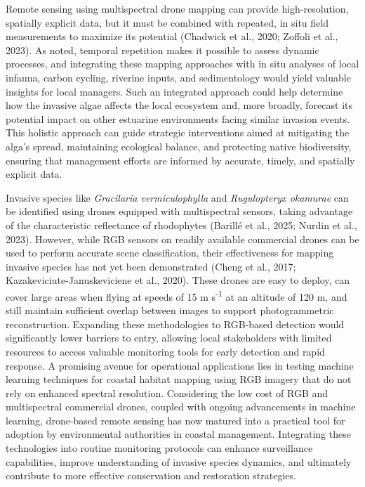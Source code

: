 \documentclass[
  letterpaper,
  DIV=11,
  numbers=noendperiod]{scrartcl}
\begin{document}
Remote sensing using multispectral drone mapping can provide
high-resolution, spatially explicit data, but it must be combined with
repeated, in situ field measurements to maximize its potential (Chadwick
et al., 2020; Zoffoli et al., 2023). As noted, temporal repetition makes
it possible to assess dynamic processes, and integrating these mapping
approaches with in situ analyses of local infauna, carbon cycling,
riverine inputs, and sedimentology would yield valuable insights for
local managers. Such an integrated approach could help determine how the
invasive algae affects the local ecosystem and, more broadly, forecast
its potential impact on other estuarine environments facing similar
invasion events. This holistic approach can guide strategic
interventions aimed at mitigating the alga's spread, maintaining
ecological balance, and protecting native biodiversity, ensuring that
management efforts are informed by accurate, timely, and spatially
explicit data.

Invasive species like \emph{Gracilaria vermiculophylla} and
\emph{Rugulopteryx okamurae} can be identified using drones equipped
with multispectral sensors, taking advantage of the characteristic
reflectance of rhodophytes (Barillé et al., 2025; Nurdin et al., 2023).
However, while RGB sensors on readily available commercial drones can be
used to perform accurate scene classification, their effectiveness for
mapping invasive species has not yet been demonstrated (Cheng et al.,
2017; Kazakeviciute-Januskeviciene et al., 2020). These drones are easy
to deploy, can cover large areas when flying at speeds of 15 m
s\textsuperscript{-1} at an altitude of 120 m, and still maintain
sufficient overlap between images to support photogrammetric
reconstruction. Expanding these methodologies to RGB-based detection
would significantly lower barriers to entry, allowing local stakeholders
with limited resources to access valuable monitoring tools for early
detection and rapid response. A promising avenue for operational
applications lies in testing machine learning techniques for coastal
habitat mapping using RGB imagery that do not rely on enhanced spectral
resolution. Considering the low cost of RGB and multispectral commercial
drones, coupled with ongoing advancements in machine learning,
drone-based remote sensing has now matured into a practical tool for
adoption by environmental authorities in coastal management. Integrating
these technologies into routine monitoring protocols can enhance
surveillance capabilities, improve understanding of invasive species
dynamics, and ultimately contribute to more effective conservation and
restoration strategies.
\end{document}
